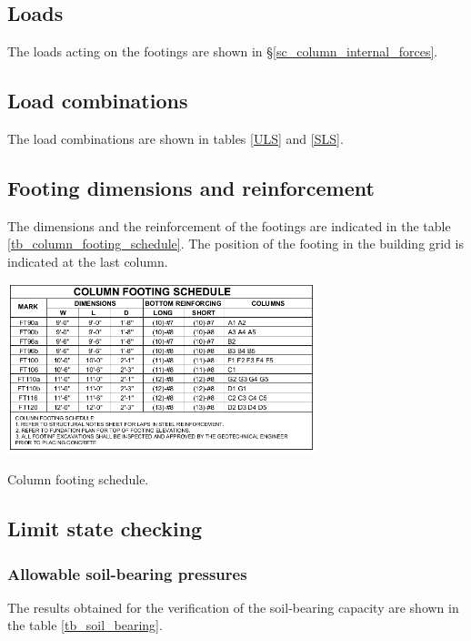 \subsection{Loads}
The loads acting on the footings are shown in \S \ref{sc_column_internal_forces}.

\subsection{Load combinations}
The load combinations are shown in tables \ref{ULS} and \ref{SLS}.

\subsection{Footing dimensions and reinforcement}
The dimensions and the reinforcement of the footings are indicated in the table \ref{tb_column_footing_schedule}. The position of the footing in the building grid is indicated at the last column.

\begin{table}
  \begin{center}
    \includegraphics[width=90mm]{figures/column_footing_schedule.png}
  \end{center}
    \caption{Column footing schedule.}\label{tb_column_footing_schedule}
\end{table}

\subsection{Limit state checking}
\subsubsection{Allowable soil-bearing pressures}
The results obtained for the verification of the soil-bearing capacity are shown in the table \ref{tb_soil_bearing}.

